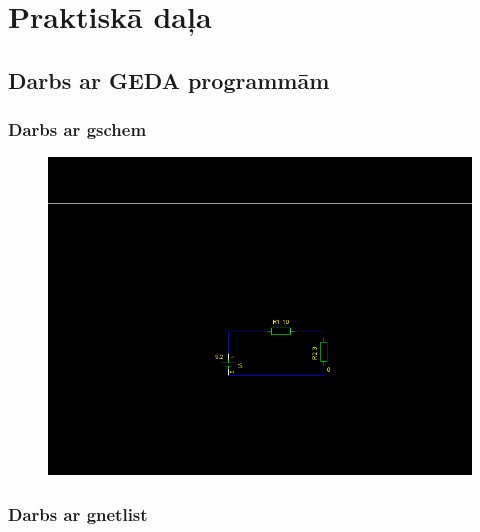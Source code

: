 \documentclass{report}
\begin{document}
\chapter{Praktiskā daļa}
\section{Darbs ar GEDA programmām}
\subsection{Darbs ar gschem}
\begin{figure}[h]
    \centering
    \includegraphics{01.png}
    \caption{}
    \label{fig:sh2}
\end{figure}

\newpage
\subsection{Darbs ar gnetlist}

\end{document}
